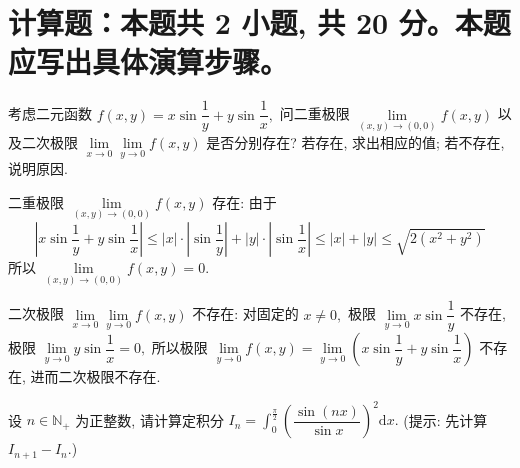 \section{计算题：本题共 2 小题, 共 20 分。本题应写出具体演算步骤。}


\begin{question}[points = 10]
考虑二元函数 $f(x,y) = x\sin\dfrac{1}{y} + y\sin\dfrac{1}{x},$ 问二重极限 $\lim\limits_{(x,y) \to (0,0)} f(x,y)$ 以及二次极限 $\lim\limits_{x \to 0} \lim\limits_{y \to 0} f(x,y)$ 是否分别存在? 若存在, 求出相应的值; 若不存在, 说明原因.

\end{question}

\begin{solution}
二重极限 $\lim\limits_{(x,y) \to (0,0)} f(x,y)$ 存在: 由于
\begin{equation*}
\left| x\sin\dfrac{1}{y} + y\sin\dfrac{1}{x} \right| \leqslant |x| \cdot \left| \sin\dfrac{1}{y} \right| + |y| \cdot \left| \sin\dfrac{1}{x} \right| \leqslant |x| + |y| \leqslant \sqrt{2(x^2 + y^2)}
\end{equation*}
所以 $\lim\limits_{(x,y) \to (0,0)} f(x,y) = 0.$

二次极限 $\lim\limits_{x \to 0}\lim\limits_{y \to 0} f(x,y)$ 不存在: 对固定的 $x \neq 0,$ 极限 $\lim\limits_{y \to 0} x\sin\dfrac{1}{y}$ 不存在, 极限 $\lim\limits_{y \to 0} y\sin\dfrac{1}{x} = 0,$ 所以极限 $\lim\limits_{y \to 0} f(x,y) = \lim\limits_{y \to 0} \left( x\sin\dfrac{1}{y} + y\sin\dfrac{1}{x} \right)$ 不存在, 进而二次极限不存在.
\end{solution}


\begin{question}[points = 10]
设 $n \in \mathbb{N}_+$ 为正整数, 请计算定积分 $\displaystyle I_n = \int_0^{\frac{\pi}{2}} \left(\dfrac{\sin (nx)}{\sin x}\right)^2 \mathrm{d}x.$ (提示: 先计算 $I_{n+1} - I_n.$)

\end{question}

